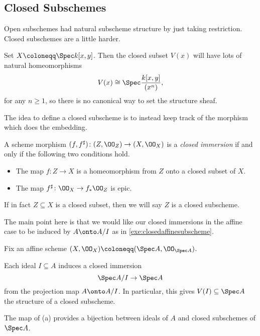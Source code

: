 \documentclass[../notes.tex]{subfiles}
\begin{document}
\subsection{Closed Subschemes}
Open subschemes had natural subscheme structure by just taking restriction. Closed subschemes are a little harder.
\begin{example}
	Set $X\coloneqq\Spec k[x,y]$. Then the closed subset $V(x)$ will have lots of natural homeomorphisms
	\[V(x)\cong\Spec\frac{k[x,y]}{(x^n)},\]
	for any $n\ge1$, so there is no canonical way to set the structure sheaf.
\end{example}
The idea to define a closed subscheme is to instead keep track of the morphism which does the embedding.
\begin{definition}
	A scheme morphism $(f,f^\sharp)\colon(Z,\OO_Z)\to(X,\OO_X)$ is a \textit{closed immersion} if and only if the following two conditions hold.
	\begin{itemize}
		\item The map $f\colon Z\to X$ is a homeomorphism from $Z$ onto a closed subset of $X$.
		\item The map $f^\sharp\colon\OO_X\to f_*\OO_Z$ is epic.
	\end{itemize}
	If in fact $Z\subseteq X$ is a closed subset, then we will say $Z$ is a closed subscheme.
\end{definition}
The main point here is that we would like our closed immersions in the affine case to be induced by $A\onto A/I$ as in \autoref{exe:closedaffinesubscheme}.
\begin{proposition}
	Fix an affine scheme $(X,\OO_X)\coloneqq(\Spec A,\OO_{\Spec A})$.
	\begin{listalph}
		\item Each ideal $I\subseteq A$ induces a closed immersion
		\[\Spec A/I\to\Spec A\]
		from the projection map $A\onto A/I$. In particular, this gives $V(I)\subseteq\Spec A$ the structure of a closed subscheme.
		\item The map of (a) provides a bijection between ideals of $A$ and closed subschemes of $\Spec A$.
	\end{listalph}
\end{proposition}
\end{document}
